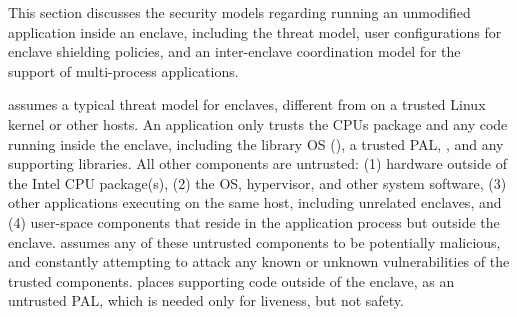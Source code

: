 \label{sec:sgx:security}

This section discusses 
the security models regarding running an unmodified application
inside an enclave, including the threat model,
user configurations for enclave shielding policies,
and an inter-enclave coordination model for the support of
multi-process applications.




\label{sec:sgx:overview:threat}

\graphenesgx{} assumes a typical threat model for \sgx{} enclaves, different from \graphene{} on a trusted Linux kernel or other hosts.
An application only trusts the CPUs package and any code running inside the enclave, including the library OS (\thelibos{}), a trusted PAL, \libc{}, and any supporting libraries. 
All other components are untrusted:
(1) hardware outside of the Intel CPU package(s),
(2) the OS, hypervisor, and other system software,
(3) other applications executing on the same host, including unrelated enclaves,
and (4) user-space components that
reside in the application process but outside the enclave.
\graphenesgx{}
assumes any of these untrusted components to be potentially malicious,
and constantly attempting to attack
any known or unknown vulnerabilities of the trusted components.
\graphenesgx{} places supporting code outside of the enclave, as an untrusted PAL, which is needed
only for liveness, but not safety.





